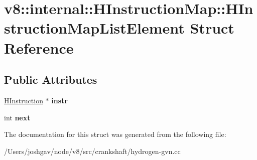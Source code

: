 \hypertarget{structv8_1_1internal_1_1_h_instruction_map_1_1_h_instruction_map_list_element}{}\section{v8\+:\+:internal\+:\+:H\+Instruction\+Map\+:\+:H\+Instruction\+Map\+List\+Element Struct Reference}
\label{structv8_1_1internal_1_1_h_instruction_map_1_1_h_instruction_map_list_element}
\subsection*{Public Attributes}
\begin{DoxyCompactItemize}
\item 
\hyperlink{classv8_1_1internal_1_1_h_instruction}{H\+Instruction} $\ast$ {\bfseries instr}\hypertarget{structv8_1_1internal_1_1_h_instruction_map_1_1_h_instruction_map_list_element_aaa56b05245f4079b4526ebfd2056e3fd}{}\label{structv8_1_1internal_1_1_h_instruction_map_1_1_h_instruction_map_list_element_aaa56b05245f4079b4526ebfd2056e3fd}

\item 
int {\bfseries next}\hypertarget{structv8_1_1internal_1_1_h_instruction_map_1_1_h_instruction_map_list_element_a15c2be79b271af7328aed9efaf9cb803}{}\label{structv8_1_1internal_1_1_h_instruction_map_1_1_h_instruction_map_list_element_a15c2be79b271af7328aed9efaf9cb803}

\end{DoxyCompactItemize}


The documentation for this struct was generated from the following file\+:\begin{DoxyCompactItemize}
\item 
/\+Users/joshgav/node/v8/src/crankshaft/hydrogen-\/gvn.\+cc\end{DoxyCompactItemize}
